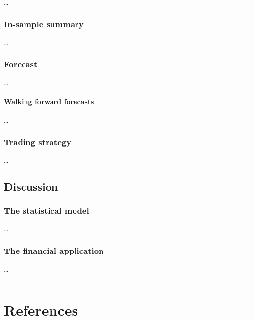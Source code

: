 \documentclass[]{article}
\let\oldparagraph\paragraph
\renewcommand{\paragraph}[1]{\oldparagraph{#1}\mbox{}}
\begin{document}
\ldots{}

\subsubsection{In-sample summary}\label{in-sample-summary}

\ldots{}

\subsubsection{Forecast}\label{forecast}

\ldots{}

\paragraph{Walking forward forecasts}\label{walking-forward-forecasts}

\ldots{}

\subsubsection{Trading strategy}\label{trading-strategy}

\ldots{}

\subsection{Discussion}\label{further-research}

\subsubsection{The statistical model}\label{the-statistical-model}

\ldots{}

\subsubsection{The financial
application}\label{the-financial-application}

\ldots{}

\begin{center}\rule{0.5\linewidth}{\linethickness}\end{center}

\section{References}\label{references}

\hypertarget{refs}{}
\end{document}
